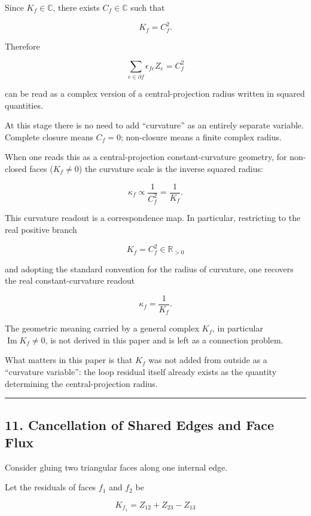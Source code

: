 \documentclass[
  a4paper,
]{article}
\begin{document}
Since \(K_f\in\mathbb C\), there exists \(C_f\in\mathbb C\) such that

\[
\boxed{K_f=C_f^2}.
\]

Therefore

\[
\sum_{e\in\partial f}\epsilon_{fe}Z_e=C_f^2
\]

can be read as a complex version of a central-projection radius written
in squared quantities.

At this stage there is no need to add ``curvature'' as an entirely
separate variable. Complete closure means \(C_f=0\); non-closure means a
finite complex radius.

When one reads this as a central-projection constant-curvature geometry,
for non-closed faces (\(K_f\neq0\)) the curvature scale is the inverse
squared radius:

\[
\kappa_f\propto \frac{1}{C_f^2}=\frac{1}{K_f}.
\]

This curvature readout is a correspondence map. In particular,
restricting to the real positive branch

\[
K_f=C_f^2\in\mathbb R_{>0}
\]

and adopting the standard convention for the radius of curvature, one
recovers the real constant-curvature readout

\[
\kappa_f=\frac{1}{K_f}.
\]

The geometric meaning carried by a general complex \(K_f\), in
particular \(\operatorname{Im}K_f\neq0\), is not derived in this paper
and is left as a connection problem.

What matters in this paper is that \(K_f\) was not added from outside as
a ``curvature variable'': the loop residual itself already exists as the
quantity determining the central-projection radius.

\begin{center}\rule{0.5\linewidth}{0.5pt}\end{center}

\subsection{11. Cancellation of Shared Edges and Face
Flux}\label{cancellation-of-shared-edges-and-face-flux}

Consider gluing two triangular faces along one internal edge.

Let the residuals of faces \(f_1\) and \(f_2\) be

\[
K_{f_1}=Z_{12}+Z_{23}-Z_{13}
\]
\end{document}
